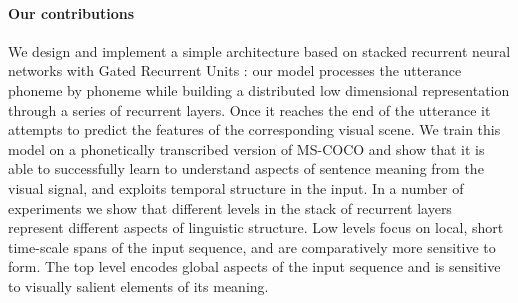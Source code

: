 \paragraph{Our contributions}

We design and implement a simple architecture based on stacked
recurrent neural networks with Gated Recurrent Units
\cite{chung2014empirical}: our model processes the utterance phoneme
by phoneme while building a distributed low dimensional representation
through a series of recurrent layers. Once it reaches the end of the
utterance it attempts to predict the features of the corresponding
visual scene. We train this model on a phonetically transcribed
version of MS-COCO \cite{lin2014microsoft} and show that it is able to
successfully learn to understand aspects of sentence meaning from the
visual signal, and exploits temporal structure in the input. In a
number of experiments we show that different levels in the stack of
recurrent layers represent different aspects of linguistic
structure. Low levels focus on local, short time-scale spans of the
input sequence, and are comparatively more sensitive to form. The top
level encodes global aspects of the input sequence and is sensitive to
visually salient elements of its meaning.
